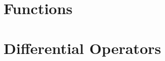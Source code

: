 \documentclass[Total.tex]{subfiles}
\begin{document}
	\chapter{Functions}
	\chapter{Differential Operators}
\end{document}
